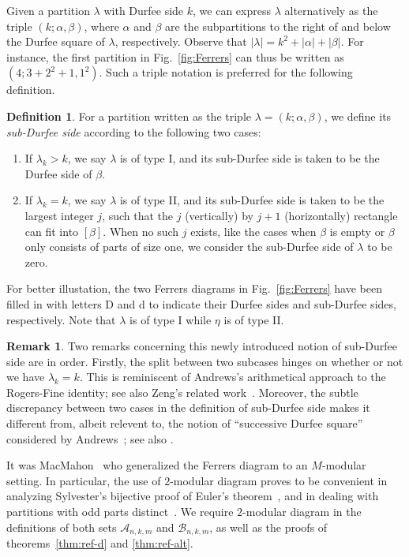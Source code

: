 \documentclass[11pt,reqno]{amsart}
\numberwithin{equation}{section}
\theoremstyle{plain}
\theoremstyle{definition}
\newtheorem{Def}[theorem]{Definition}
\newtheorem{remark}[theorem]{Remark}
\theoremstyle{named}
\newcommand{\abs}[1]{\left|#1\right|}
\def\cA{\mathcal{A}}
\def\cB{\mathcal{B}}
\def\la{\lambda}
\begin{document}
Given a partition $\la$ with Durfee side $k$, we can express $\la$ alternatively as the triple $(k;\alpha,\beta)$, where $\alpha$ and $\beta$ are the subpartitions to the right of and below the Durfee square of $\la$, respectively. Observe that $\abs{\lambda}=k^2+\abs{\alpha}+\abs{\beta}$. For instance, the first partition in Fig.~\ref{fig:Ferrers} can thus be written as $(4;3+2^2+1,1^2)$. Such a triple notation is preferred for the following definition.

\begin{Def}\label{def:subDurfee}
For a partition written as the triple $\la=(k;\alpha,\beta)$, we define its {\it sub-Durfee side} according to the following two cases:
\begin{enumerate}
	\item If $\la_k>k$, we say $\la$ is of type I, and its sub-Durfee side is taken to be the Durfee side of $\beta$.
	\item If $\la_k=k$, we say $\la$ is of type II, and its sub-Durfee side is taken to be the largest integer $j$, such that the $j$ (vertically) by $j+1$ (horizontally) rectangle can fit into $[\beta]$. When no such $j$ exists, like the cases when $\beta$ is empty or $\beta$ only consists of parts of size one, we consider the sub-Durfee side of $\la$ to be zero.
\end{enumerate}
\end{Def}

For better illustation, the two Ferrers diagrams in Fig.~\ref{fig:Ferrers} have been filled in with letters D and d to indicate their Durfee sides and sub-Durfee sides, respectively. Note that $\la$ is of type I while $\eta$ is of type II.

\begin{remark}
Two remarks concerning this newly introduced notion of sub-Durfee side are in order. Firstly, the split between two subcases hinges on whether or not we have $\la_k=k$. This is reminiscent of Andrews's arithmetical approach \cite[Sect.~4]{and72} to the Rogers-Fine identity; see also Zeng's related work~\cite[Sect.~3]{zen05}. Moreover, the subtle discrepancy between two cases in the definition of sub-Durfee side makes it different from, albeit relevent to, the notion of ``successive Durfee square'' considered by Andrews~\cite{and79}; see also \cite[Sect.~3.1]{war97}.
\end{remark}

It was MacMahon~\cite{mac23} who generalized the Ferrers diagram to an $M$-modular setting. In particular, the use of $2$-modular diagram proves to be convenient in analyzing Sylvester's bijective proof of Euler's theorem~\cite{bes94}, and in dealing with partitions with odd parts distinct~\cite{LO09}. We require $2$-modular diagram in the definitions of both sets $\cA_{n,k,m}$ and $\cB_{n,k,m}$, as well as the proofs of theorems~\ref{thm:ref-d} and \ref{thm:ref-alt}.
\end{document}
